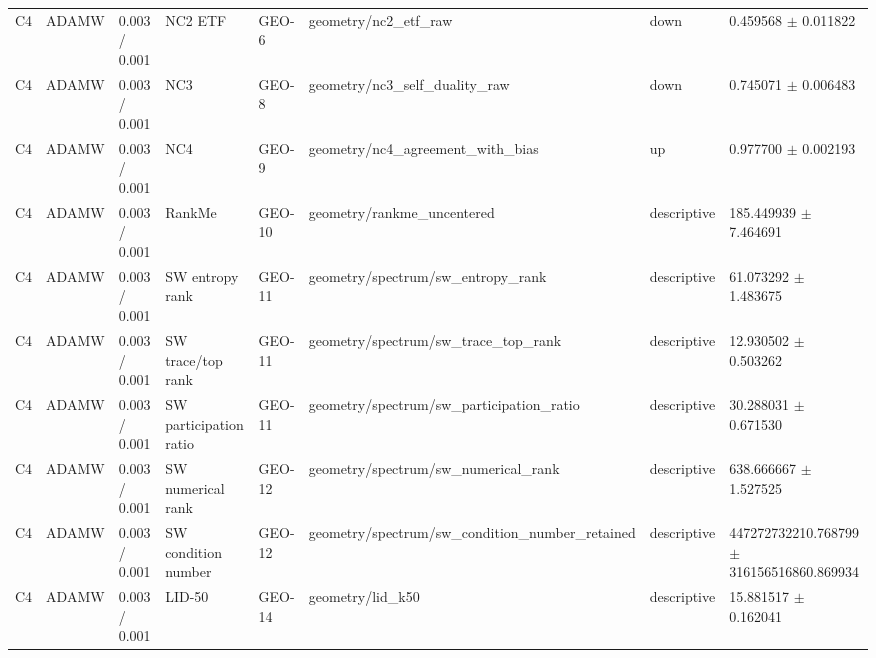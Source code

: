 \begin{longtable}{llllllll}
C4 & ADAMW & 0.003 / 0.001 & NC2 ETF & GEO-6 & geometry/nc2\_etf\_raw & down & 0.459568 $\pm$ 0.011822 \\
C4 & ADAMW & 0.003 / 0.001 & NC3 & GEO-8 & geometry/nc3\_self\_duality\_raw & down & 0.745071 $\pm$ 0.006483 \\
C4 & ADAMW & 0.003 / 0.001 & NC4 & GEO-9 & geometry/nc4\_agreement\_with\_bias & up & 0.977700 $\pm$ 0.002193 \\
C4 & ADAMW & 0.003 / 0.001 & RankMe & GEO-10 & geometry/rankme\_uncentered & descriptive & 185.449939 $\pm$ 7.464691 \\
C4 & ADAMW & 0.003 / 0.001 & SW entropy rank & GEO-11 & geometry/spectrum/sw\_entropy\_rank & descriptive & 61.073292 $\pm$ 1.483675 \\
C4 & ADAMW & 0.003 / 0.001 & SW trace/top rank & GEO-11 & geometry/spectrum/sw\_trace\_top\_rank & descriptive & 12.930502 $\pm$ 0.503262 \\
C4 & ADAMW & 0.003 / 0.001 & SW participation ratio & GEO-11 & geometry/spectrum/sw\_participation\_ratio & descriptive & 30.288031 $\pm$ 0.671530 \\
C4 & ADAMW & 0.003 / 0.001 & SW numerical rank & GEO-12 & geometry/spectrum/sw\_numerical\_rank & descriptive & 638.666667 $\pm$ 1.527525 \\
C4 & ADAMW & 0.003 / 0.001 & SW condition number & GEO-12 & geometry/spectrum/sw\_condition\_number\_retained & descriptive & 447272732210.768799 $\pm$ 316156516860.869934 \\
C4 & ADAMW & 0.003 / 0.001 & LID-50 & GEO-14 & geometry/lid\_k50 & descriptive & 15.881517 $\pm$ 0.162041 \\
\end{longtable}
